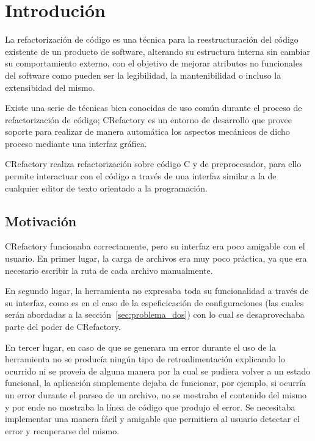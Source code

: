 \documentclass[a4paper,oneside,12pt]{article}
\begin{document}
\section{Introduci\'on}
\label{sec:intro}
La refactorizaci\'on de c\'odigo es una t\'ecnica para la reestructuraci\'on del c\'odigo existente de un producto de software, alterando su estructura interna sin cambiar su comportamiento externo, con el objetivo de mejorar atributos no funcionales del software como pueden ser la legibilidad, la mantenibilidad o incluso la extensibidad del mismo.

Existe una serie de t\'ecnicas bien conocidas de uso com\'un durante el proceso de refactorizaci\'on de c\'odigo; CRefactory es un entorno de desarrollo que provee soporte para realizar de manera autom\'atica los aspectos mec\'anicos de dicho proceso mediante una interfaz gr\'afica.

CRefactory realiza refactorizaci\'on sobre c\'odigo C y de preprocesador, para ello permite interactuar con el c\'odigo a trav\'es de una interfaz similar a la de cualquier editor de texto orientado a la programaci\'on.

\subsection{Motivaci\'on}

CRefactory funcionaba correctamente, pero su interfaz era poco amigable con el usuario. En primer lugar, la carga de archivos era muy poco pr\'actica, ya que era necesario escribir la ruta de cada archivo manualmente.

En segundo lugar, la herramienta no expresaba toda su funcionalidad a trav\'es de su interfaz, como es en el caso de la espeficicaci\'on de configuraciones (las cuales ser\'an abordadas a la secci\'on~\ref{sec:problema_dos}) con lo cual se desaprovechaba  parte del poder de CRefactory.

En tercer lugar, en caso de que se generara un error durante el uso de la herramienta no se produc\'ia ning\'un tipo de retroalimentaci\'on explicando lo ocurrido ni se prove\'ia de alguna manera por la cual se pudiera volver a un estado funcional, la aplicaci\'on simplemente dejaba de funcionar, por ejemplo, si ocurr\'ia un error durante el parseo de un archivo, no se mostraba el contenido del mismo y por ende no mostraba la l\'inea de c\'odigo que produjo el error. Se necesitaba implementar una manera f\'acil y amigable que permitiera al usuario detectar el error y recuperarse del mismo.
\end{document}
